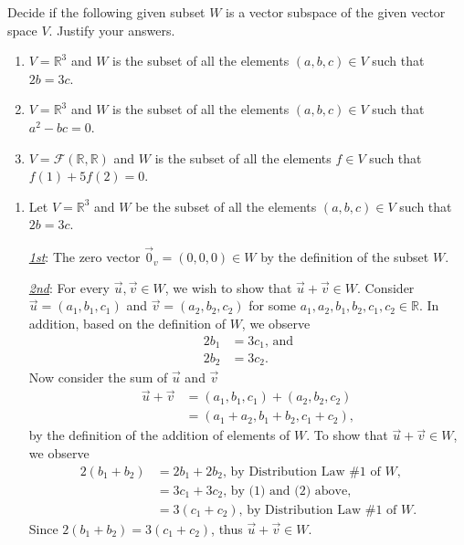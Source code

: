 \documentclass[12pt,answers]{exam}
\newenvironment{problem}[2][Problem]{\begin{trivlist}
\item[\hskip \labelsep {\bfseries #1}\hskip \labelsep {\bfseries #2.}]}{\end{trivlist}}
\begin{document}
\begin{problem}{2}
Decide if the following given subset $W$ is a vector subspace of the given vector space $V$. Justify your answers.
\begin{enumerate}[label=(\alph*)]
\item $V=\mathbb{R}^{3}$ and $W$ is the subset of all the elements $(a,b,c)\in V$ such that $2b=3c$.
\item $V=\mathbb{R}^{3}$ and $W$ is the subset of all the elements $(a,b,c)\in V$ such that $a^{2}-bc=0$.
\item $V= \mathcal{F}(\mathbb{R},\mathbb{R})$ and $W$ is the subset of all the elements $f\in V$ such that $f(1)+5f(2)=0$.
\end{enumerate}
\end{problem}

\begin{solution}
\begin{enumerate}[label=(\alph*)]
\item Let $V=\mathbb{R}^{3}$ and $W$ be the subset of all the elements $(a,b,c)\in V$ such that $2b=3c$. 

	\underline{\textit{1st}}: The zero vector $\vec{0}_{v}=(0,0,0)\in W$ by the definition of the subset $W$.
	
	\underline{\textit{2nd}}: For every $\vec{u},\vec{v} \in W$, we wish to show that $\vec{u}+\vec{v}\in W$. Consider $\vec{u}=(a_1,b_1,c_1)$ and $\vec{v}=(a_2,b_2,c_2)$ for some 		$a_1,a_2,b_1,b_2,c_1,c_2\in \mathbb{R}$. In addition, based on the definition of $W$, we observe
	\begin{align}
		2b_1 &= 3c_1\text{, and} \\
		2b_2 &= 3c_2.
	\end{align}
	Now consider the sum of $\vec{u}$ and $\vec{v}$
	\begin{align*}
		\vec{u}+\vec{v} &= (a_1,b_1,c_1) + (a_2,b_2,c_2) \\
		&= (a_1+a_2,b_1+b_2,c_1+c_2),
	\end{align*}
	by the definition of the addition of elements of $W$. To show that $\vec{u}+\vec{v} \in W$, we observe
	\begin{align*}
		2(b_1+b_2) &= 2b_1+2b_2 \text{, by Distribution Law \#1 of $W$,} \\
		&= 3c_1+3c_2 \text{, by (1) and (2) above,} \\
		&= 3(c_1+c_2) \text{, by Distribution Law \#1 of $W$.}
	\end{align*}
	Since $2(b_1+b_2)=3(c_1+c_2)$, thus $\vec{u}+\vec{v} \in W$. 
	

\end{enumerate}
\end{solution}
\end{document}
